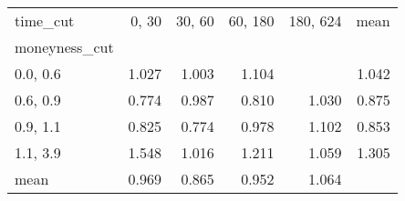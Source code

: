 \begin{tabular}{lrrrrr}
\toprule
time\_cut &  0, 30 &  30, 60 &  60, 180 &  180, 624 &  mean \\
moneyness\_cut &          &           &            &             &       \\
\midrule
0.0, 0.6    &    1.027 &     1.003 &      1.104 &             & 1.042 \\
0.6, 0.9    &    0.774 &     0.987 &      0.810 &       1.030 & 0.875 \\
0.9, 1.1    &    0.825 &     0.774 &      0.978 &       1.102 & 0.853 \\
1.1, 3.9    &    1.548 &     1.016 &      1.211 &       1.059 & 1.305 \\
mean          &    0.969 &     0.865 &      0.952 &       1.064 &       \\
\bottomrule
\end{tabular}
